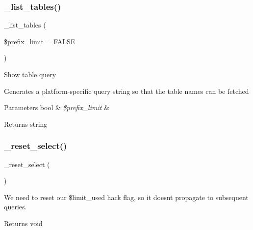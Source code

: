 \subsubsection{\texorpdfstring{\+\_\+list\+\_\+tables()}{\_list\_tables()}}
{\footnotesize\ttfamily \+\_\+list\+\_\+tables (\begin{DoxyParamCaption}\item[{}]{\$prefix\+\_\+limit = {\ttfamily FALSE} }\end{DoxyParamCaption})\hspace{0.3cm}{\ttfamily [protected]}}

Show table query

Generates a platform-\/specific query string so that the table names can be fetched


\begin{DoxyParams}[1]{Parameters}
bool & {\em \$prefix\+\_\+limit} & \\
\hline
\end{DoxyParams}
\begin{DoxyReturn}{Returns}
string 
\end{DoxyReturn}
\mbox{\label{class_c_i___d_b__oci8__driver_a7c6cc16411b9c36fbfd42a9317f64317}} 
\subsubsection{\texorpdfstring{\+\_\+reset\+\_\+select()}{\_reset\_select()}}
{\footnotesize\ttfamily \+\_\+reset\+\_\+select (\begin{DoxyParamCaption}{ }\end{DoxyParamCaption})\hspace{0.3cm}{\ttfamily [protected]}}

We need to reset our \$limit\+\_\+used hack flag, so it doesn\textquotesingle{}t propagate to subsequent queries.

\begin{DoxyReturn}{Returns}
void 
\end{DoxyReturn}
\mbox{\label{class_c_i___d_b__oci8__driver_ac81ac882c1d54347d810199a15856aac}} 
